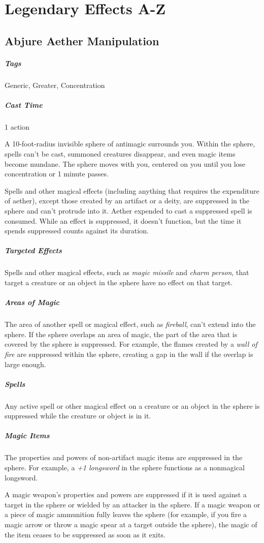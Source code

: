 \section{Legendary Effects A-Z}
\subsection{Abjure Aether Manipulation\label{spell:abjure-aether-manipulation}}
\subparagraph*{Tags} Generic, Greater, Concentration
\subparagraph*{Cast Time} 1 action

A 10-foot-radius invisible sphere of antimagic surrounds you. Within the sphere, spells can’t be cast, summoned creatures disappear, and even magic items become mundane. The sphere moves with you, centered on you until you lose concentration or 1 minute passes.

Spells and other magical effects (including anything that requires the expenditure of aether), except those created by an artifact or a deity, are suppressed in the sphere and can’t protrude into it. Aether expended to cast a suppressed spell is consumed. While an effect is suppressed, it doesn’t function, but the time it spends suppressed counts against its duration.

\subparagraph*{Targeted Effects} Spells and other magical effects, such as \textit{magic missile} and \textit{charm person}, that target a creature or an object in the sphere have no effect on that target.

\subparagraph*{Areas of Magic} The area of another spell or magical effect, such as \textit{fireball}, can’t extend into the sphere. If the sphere overlaps an area of magic, the part of the area that is covered by the sphere is suppressed. For example, the flames created by a \textit{wall of fire} are suppressed within the sphere, creating a gap in the wall if the overlap is large enough.

\subparagraph*{Spells} Any active spell or other magical effect on a creature or an object in the sphere is suppressed while the creature or object is in it.

\subparagraph*{Magic Items} The properties and powers of non-artifact magic items are suppressed in the sphere. For example, a \textit{+1 longsword} in the sphere functions as a nonmagical longsword.

A magic weapon’s properties and powers are suppressed if it is used against a target in the sphere or wielded by an attacker in the sphere. If a magic weapon or a piece of magic ammunition fully leaves the sphere (for example, if you fire a magic arrow or throw a magic spear at a target outside the sphere), the magic of the item ceases to be suppressed as soon as it exits.

